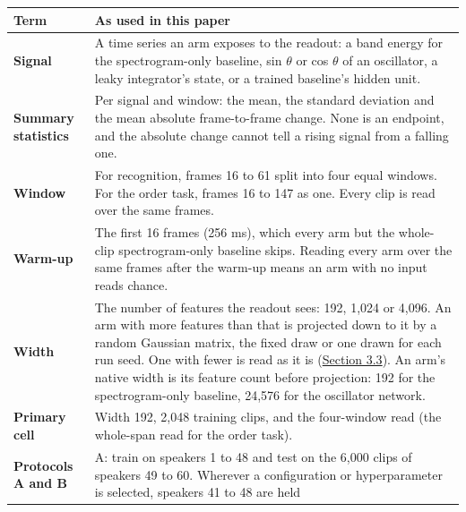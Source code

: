 \documentclass{article}
\begin{document}
{\def\LTcaptype{none} %
\begin{longtable}[]{@{}
  >{\raggedright\arraybackslash}p{}
  >{\raggedright\arraybackslash}p{}@{}}
\toprule\noalign{}
\begin{minipage}[b]{\linewidth}\raggedright
Term
\end{minipage} & \begin{minipage}[b]{\linewidth}\raggedright
As used in this paper
\end{minipage} \\
\midrule\noalign{}
\endhead
\bottomrule\noalign{}
\endlastfoot
\textbf{Signal} & A time series an arm exposes to the readout: a band
energy for the spectrogram-only baseline, sin \ensuremath{\theta} or cos
\ensuremath{\theta} of an oscillator, a leaky integrator's state, or a
trained baseline's hidden unit. \\
\cmidrule{1-2}\textbf{Summary statistics} & Per signal and window: the
mean, the standard deviation and the mean absolute frame-to-frame
change. None is an endpoint, and the absolute change cannot tell a
rising signal from a falling one. \\
\cmidrule{1-2}\textbf{Window} & For recognition, frames 16 to 61 split
into four equal windows. For the order task, frames 16 to 147 as one.
Every clip is read over the same frames. \\
\cmidrule{1-2}\textbf{Warm-up} & The first 16 frames (256 ms), which
every arm but the whole-clip spectrogram-only baseline skips. Reading
every arm over the same frames after the warm-up means an arm with no
input reads chance. \\
\cmidrule{1-2}\textbf{Width} & The number of features the readout sees:
192, 1,024 or 4,096. An arm with more features than that is projected
down to it by a random Gaussian matrix, the fixed draw or one drawn for
each run seed. One with fewer is read as it is
(\hyperref[sec-3-3]{Section 3.3}). An arm's native width is its feature
count before projection: 192 for the spectrogram-only baseline, 24,576
for the oscillator network. \\
\cmidrule{1-2}\textbf{Primary cell} & Width 192, 2,048 training clips,
and the four-window read (the whole-span read for the order task). \\
\cmidrule{1-2}\textbf{Protocols A and B} & A: train on speakers 1 to 48
and test on the 6,000 clips of speakers 49 to 60. Wherever a
configuration or hyperparameter is selected, speakers 41 to 48 are held

\end{longtable}}
\end{document}
